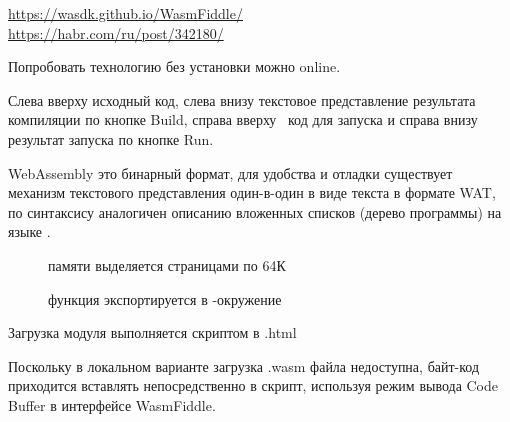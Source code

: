 
\noindent
\url{https://wasdk.github.io/WasmFiddle/}\\
\url{https://habr.com/ru/post/342180/}
\bigskip

Попробовать технологию без установки можно online.

\bigskip
{}

Слева вверху исходный код, слева внизу текстовое представление результата
компиляции по кнопке Build, справа вверху \js\ код для запуска и справа
внизу результат запуска по кнопке Run.

WebAssembly это бинарный формат, для удобства и отладки существует механизм
текстового представления один-в-один в виде текста в формате WAT, по синтаксису
аналогичен описанию вложенных списков (дерево программы) на языке \lisp.

\begin{description}
\item[] памяти выделяется страницами по 64К
\item[] функция экспортируется в
\js-окружение
\end{description}

Загрузка модуля выполняется скриптом в .html

Поскольку в локальном варианте загрузка .wasm файла недоступна, байт-код
приходится вставлять непосредственно в скрипт, используя режим вывода Code
Buffer в интерфейсе WasmFiddle.

